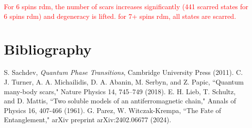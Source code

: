 \documentclass{article}
\begin{document}

\textcolor{red}{For 6 spins rdm, the number of scars increases significantly (441 scarred states for 6 spins rdm) and degeneracy is lifted. for 7+ spins rdm, all states are scarred.}

\section*{Bibliography}
\begin{thebibliography}{9}
     S. Sachdev, \textit{Quantum Phase Transitions}, Cambridge University Press (2011).
     C. J. Turner, A. A. Michailidis, D. A. Abanin, M. Serbyn, and Z. Papic, ``Quantum many-body scars," Nature Physics 14, 745–749 (2018).
     E. H. Lieb, T. Schultz, and D. Mattis, ``Two soluble models of an antiferromagnetic chain," Annals of Physics 16, 407-466 (1961).
     G. Parez, W. Witczak-Krempa, ``The Fate of Entanglement," arXiv preprint arXiv:2402.06677 (2024).
\end{thebibliography}
\end{document}
